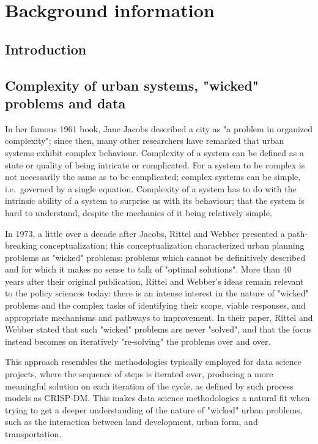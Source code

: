 \chapter[Background information]{Background information} \label{ch:background}

\section{Introduction} \label{sec:intro_background}


\section{Complexity of urban systems, "wicked" problems and data} \label{sec:complexity_and_wicked_problems_and_data}

In her famous 1961 book, Jane Jacobs\cite{Jacobs1961} described a city as "a problem in organized complexity";
since then, many other researchers have remarked that urban systems exhibit complex behaviour\cite{Batty2008, Bettencourt2013}.
Complexity of a system can be defined as a state or quality of being intricate or complicated.
For a system to be complex is not necessarily the same as to be complicated;
complex systems can be simple, i.e.\ governed by a single equation.
Complexity of a system has to do with the intrinsic ability of a system to surprise us with its behaviour;
that the system is hard to understand, despite the mechanics of it being relatively simple.

In 1973, a little over a decade after Jacobs, Rittel and Webber\cite{Rittel1973} presented a path-breaking conceptualization;
this conceptualization characterized urban planning problems as "wicked" problems: problems which cannot be definitively described and for which it makes no sense to talk of "optimal solutions".
More than 40 years after their original publication, Rittel and Webber's ideas remain relevant to the policy sciences today: there is an intense interest in the nature of "wicked" problems and the complex tasks of identifying their scope, viable responses, and appropriate mechanisms and pathways to improvement\cite{Crowley2017}.
In their paper, Rittel and Webber stated that such "wicked" problems are never "solved", and that the focus instead becomes on iteratively "re-solving" the problems over and over.

This approach resembles the methodologies typically employed for data science projects, where the sequence of steps is iterated over, producing a more meaningful solution on each iteration of the cycle, as defined by such process models as CRISP-DM\cite{Shearer2000}.
This makes data science methodologies a natural fit when trying to get a deeper understanding of the nature of "wicked" urban problems, such as the interaction between land development, urban form, and transportation.

